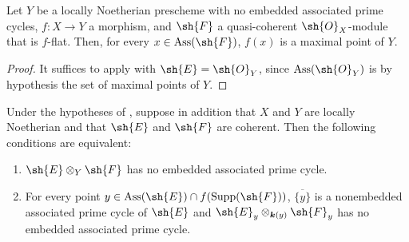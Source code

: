 \begin{corollary}[3.3.2]
\label{IV.3.3.2}
Let $Y$ be a locally Noetherian prescheme with no embedded associated prime cycles, $f:X\to Y$ a morphism, and $\sh{F}$ a quasi-coherent $\sh{O}_X$-module that is $f$-flat.
Then, for every $x\in\operatorname{Ass}(\sh{F})$, $f(x)$ is a maximal point of $Y$.
\end{corollary}

\begin{proof}
It suffices to apply  with $\sh{E}=\sh{O}_Y$, since $\operatorname{Ass}(\sh{O}_Y)$ is by hypothesis the set of maximal points of $Y$.
\end{proof}

\begin{corollary}[3.3.3]
\label{IV.3.3.3}
Under the hypotheses of , suppose in addition that $X$ and $Y$ are locally Noetherian and that $\sh{E}$ and $\sh{F}$ are coherent.
Then the following conditions are equivalent:
\begin{enumerate}
  \item[\emph{a)}] $\sh{E}\otimes_Y\sh{F}$ has no embedded associated prime cycle.
  \item[\emph{b)}] For every point $y\in\operatorname{Ass}(\sh{E})\cap f(\operatorname{Supp}(\sh{F}))$, $\overline{\{y\}}$ is a nonembedded associated prime cycle of $\sh{E}$ and $\sh{E}_y\otimes_{\boldsymbol{k}(y)}\sh{F}_y$ has no embedded associated prime cycle.
\end{enumerate}
\end{corollary}

